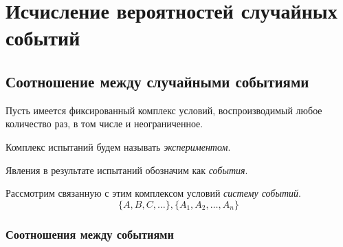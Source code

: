 \chapter{Исчисление вероятностей случайных событий}
\section{Соотношение между случайными событиями}


Пусть имеется фиксированный комплекс условий, воспроизводимый любое количество раз, в том числе и неограниченное.

\begin{definition}
	Комплекс испытаний будем называть \textit{экспериментом}.
\end{definition}

\begin{definition}
	Явления в результате испытаний обозначим как \textit{события}.
\end{definition}

Рассмотрим связанную с этим комплексом условий \textit{систему событий}.
\[
	\{A, B, C, \dots\},
	\{A_1, A_2, \dots, A_n\}
\]

\subsection{Соотношения между событиями}


